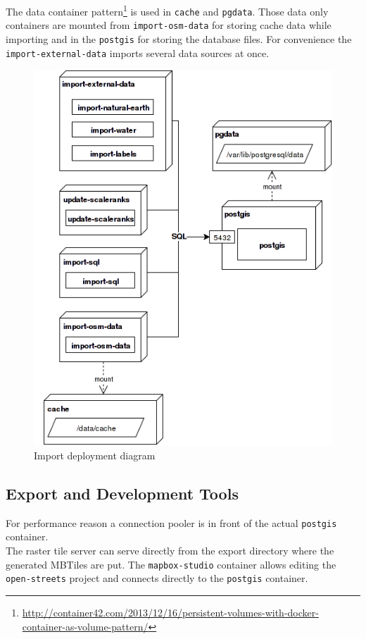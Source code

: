 The data container pattern\footnote{\url{http://container42.com/2013/12/16/persistent-volumes-with-docker-container-as-volume-pattern/}} is used in \texttt{cache} and \texttt{pgdata}. Those
data only containers are mounted from \texttt{import-osm-data} for storing cache data while importing and in the \texttt{postgis} for storing the database files.
For convenience the \texttt{import-external-data} imports several data sources at once.

\begin{figure}[h]
  \includegraphics[scale=0.6]{images/deployment_import.png}
  \caption{Import deployment diagram}
\end{figure}

\newpage
\subsection{Export and Development Tools}

For performance reason a connection pooler is in front of the actual \texttt{postgis} container.
\\
The raster tile server can serve directly from the export directory where the generated MBTiles
are put. The \texttt{mapbox-studio} container allows editing the \texttt{open-streets} project and connects directly to the \texttt{postgis} container.

